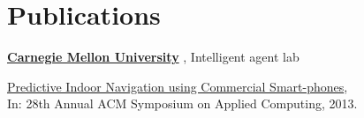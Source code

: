 \section{Publications} %
\href{http://www.ri.cmu.edu/}{\textbf{Carnegie Mellon University}} , Intelligent agent lab

\vspace{-0.1cm}

\begin{outerlist}
    \item[] \href{http://www.ri.cmu.edu/pub_files/2011/12/percom-navigation-main.pdf}{Predictive Indoor Navigation using Commercial Smart-phones}, \\
In: 28th Annual ACM Symposium on Applied Computing, 2013.
\end{outerlist}
\label{sec:section}
